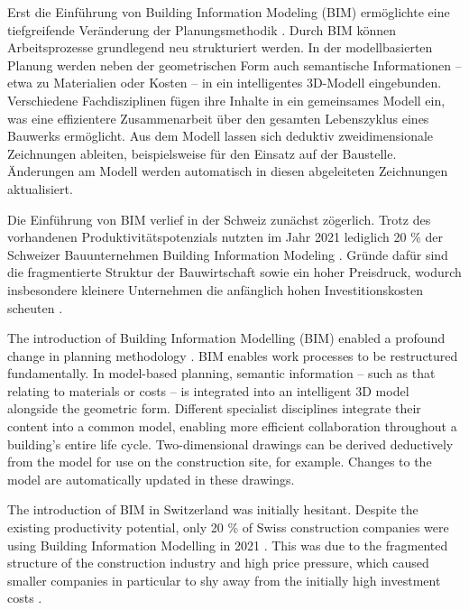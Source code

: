 \begin{German}
    Erst die Einführung von Building Information Modeling (BIM) ermöglichte eine tiefgreifende Veränderung der Planungsmethodik \cite{eichlerBIMcertHandbuchGrundlagenwissen2023}. Durch BIM können Arbeitsprozesse grundlegend neu strukturiert werden. In der modellbasierten Planung werden neben der geometrischen Form auch semantische Informationen -- etwa zu Materialien oder Kosten -- in ein intelligentes 3D-Modell eingebunden. Verschiedene Fachdisziplinen fügen ihre Inhalte in ein gemeinsames Modell ein, was eine effizientere Zusammenarbeit über den gesamten Lebenszyklus eines Bauwerks ermöglicht. Aus dem Modell lassen sich deduktiv zweidimensionale Zeichnungen ableiten, beispielsweise für den Einsatz auf der Baustelle. Änderungen am Modell werden automatisch in diesen abgeleiteten Zeichnungen aktualisiert. \cite{eichlerBIMcertHandbuchGrundlagenwissen2023}

    Die Einführung von BIM verlief in der Schweiz zunächst zögerlich. Trotz des vorhandenen Produktivitätspotenzials nutzten im Jahr 2021 lediglich 20 \% der Schweizer Bauunternehmen Building Information Modeling \cite{heinrichSchweizImBIMEuropavergleich2022}. Gründe dafür sind die fragmentierte Struktur der Bauwirtschaft sowie ein hoher Preisdruck, wodurch insbesondere kleinere Unternehmen die anfänglich hohen Investitionskosten scheuten \cite{ivanicErfolgreicheEinfuehrungBuilding2020}.
\end{German}

\begin{English}
    The introduction of Building Information Modelling (BIM) enabled a profound change in planning methodology \cite{eichlerBIMcertHandbuchGrundlagenwissen2023}. BIM enables work processes to be restructured fundamentally. In model-based planning, semantic information -- such as that relating to materials or costs -- is integrated into an intelligent 3D model alongside the geometric form. Different specialist disciplines integrate their content into a common model, enabling more efficient collaboration throughout a building's entire life cycle. Two-dimensional drawings can be derived deductively from the model for use on the construction site, for example. Changes to the model are automatically updated in these drawings. \cite{eichlerBIMcertHandbuchGrundlagenwissen2023}

    The introduction of BIM in Switzerland was initially hesitant. Despite the existing productivity potential, only 20 \% of Swiss construction companies were using Building Information Modelling in 2021 \cite{heinrichSchweizImBIMEuropavergleich2022}. This was due to the fragmented structure of the construction industry and high price pressure, which caused smaller companies in particular to shy away from the initially high investment costs \cite{ivanicErfolgreicheEinfuehrungBuilding2020}.
\end{English}

